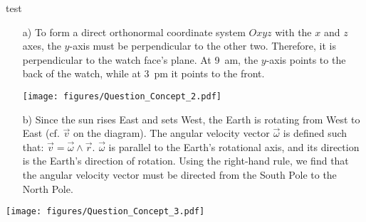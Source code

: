 %
%
test
\begin{center}
\vspace*{5mm}
\end{center}

\begin{enumerate}
\item[a)] To form a direct orthonormal coordinate system $Oxyz$ with the $x$ and $z$ axes, the $y$-axis must be perpendicular to the other two. Therefore, it is perpendicular to the watch face's plane. At 9~am, the $y$-axis points to the back of the watch, while at 3~pm it points to the front.
\hspace*{0.5cm}
\begin{center}
 \texttt{[image: figures/Question\_Concept\_2.pdf]}
\end{center}
\end{enumerate}
\begin{minipage}{0.6\textwidth}\begin{enumerate}
\item[b)] Since the sun rises East and sets West, the Earth is rotating from West to East (cf. $\vec{v}$ on the diagram). The angular velocity vector $\vec{\omega}$ is defined such that: $\vec{v}=\vec{\omega}\wedge\vec{r}$. $\vec{\omega}$ is parallel to the Earth's rotational axis, and its direction is the Earth's direction of rotation. Using the right-hand rule, we find that the angular velocity vector must be directed from the South Pole to the North Pole.
\end{enumerate}
\end{minipage}
\begin{minipage}{0.4\textwidth}\begin{center}
\texttt{[image: figures/Question\_Concept\_3.pdf]}
\end{center}
\end{minipage}
